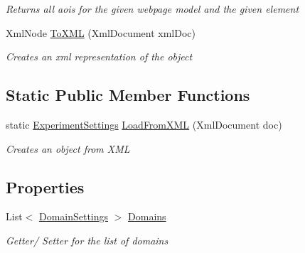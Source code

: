 \begin{DoxyCompactItemize}
\begin{DoxyCompactList}\small\item\em Returns all aois for the given webpage model and the given element \end{DoxyCompactList}\item 
Xml\+Node \hyperlink{class_web_analyzer_1_1_models_1_1_settings_model_1_1_experiment_settings_a3607aab81aaf98bd53880595cf2d1c78}{To\+X\+M\+L} (Xml\+Document xml\+Doc)
\begin{DoxyCompactList}\small\item\em Creates an xml representation of the object \end{DoxyCompactList}\end{DoxyCompactItemize}
\subsection*{Static Public Member Functions}
\begin{DoxyCompactItemize}
\item 
static \hyperlink{class_web_analyzer_1_1_models_1_1_settings_model_1_1_experiment_settings}{Experiment\+Settings} \hyperlink{class_web_analyzer_1_1_models_1_1_settings_model_1_1_experiment_settings_abed3a5d3b5034e8f8f466082645abedf}{Load\+From\+X\+M\+L} (Xml\+Document doc)
\begin{DoxyCompactList}\small\item\em Creates an object from X\+M\+L \end{DoxyCompactList}\end{DoxyCompactItemize}
\subsection*{Properties}
\begin{DoxyCompactItemize}
\item 
List$<$ \hyperlink{class_web_analyzer_1_1_models_1_1_settings_model_1_1_domain_settings}{Domain\+Settings} $>$ \hyperlink{class_web_analyzer_1_1_models_1_1_settings_model_1_1_experiment_settings_a3eb9dd2816871834368fe4dfd5a1b52e}{Domains}
\begin{DoxyCompactList}\small\item\em Getter/ Setter for the list of domains \end{DoxyCompactList}\end{DoxyCompactItemize}
